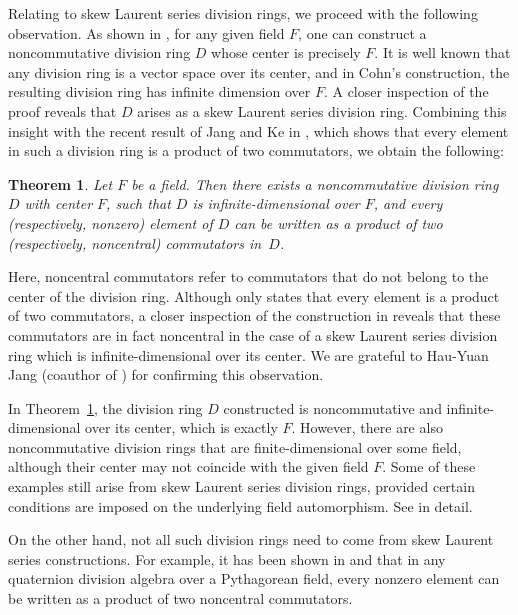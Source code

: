 \documentclass[11pt]{article}
\newtheorem{theorem}{Theorem}
\theoremstyle{definition}
\begin{document}
{{{{				
				Relating to skew Laurent series division rings, we proceed with the following observation. As shown in \cite[Proposition 2.3.5]{Bo_Cohn_95}, for any given field \( F \), one can construct a noncommutative division ring \( D \) whose center is precisely \( F \). It is well known that any division ring is a vector space over its center, and in Cohn's construction, the resulting division ring has infinite dimension over \( F \). A closer inspection of the proof reveals that \( D \) arises as a skew Laurent series division ring. Combining this insight with the recent result of Jang and Ke in \cite[Theorem]{Pa_JaKe_25}, which shows that every element in such a division ring is a product of two commutators, we obtain the following:
				
				\begin{theorem}\label{exist}
					Let \( F \) be a field. Then there exists a noncommutative division ring \( D \) with center \( F \), such that \( D \) is infinite-dimensional over \( F \), and every (respectively, nonzero) element of \( D \) can be written as a product of two (respectively, noncentral) commutators in~\( D \).
				\end{theorem}
				
				Here, noncentral commutators refer to commutators that do not belong to the center of the division ring. Although \cite[Theorem]{Pa_JaKe_25} only states that every element is a product of two commutators, a closer inspection of the construction in \cite[Section 2.3]{Pa_JaKe_25} reveals that these commutators are in fact noncentral in the case of a skew Laurent series division ring which is infinite-dimensional over its center. We are grateful to Hau-Yuan Jang  (coauthor of \cite{Pa_JaKe_25}) for confirming this observation.
				
				
				
				In Theorem~\ref{exist}, the division ring \( D \) constructed is noncommutative and infinite-dimensional over its center, which is exactly \( F \). However, there are also noncommutative division rings that are finite-dimensional over some field, although their center may not coincide with the given field \( F \). Some of these examples still arise from skew Laurent series division rings, provided certain conditions are imposed on the underlying field automorphism. See \cite{Pa_JaKe_25} in detail.
				
				On the other hand, not all such division rings need to come from skew Laurent series constructions. For example, it has been shown in \cite[Theorem 5.1]{Pa_DaDuSo_24} and \cite[Theorem 3.1]{Pa_DaDuSo_25} that in any quaternion division algebra over a Pythagorean field, every nonzero element can be written as a product of two noncentral commutators.
				
}}}}
\end{document}
